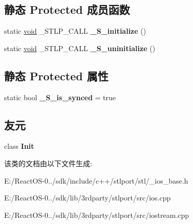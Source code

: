 \subsection*{静态 Protected 成员函数}
\begin{DoxyCompactItemize}
\item 
\mbox{\label{classios__base_ac63009681540a793259bae95029d26e6}} 
static \hyperlink{interfacevoid}{void} \+\_\+\+S\+T\+L\+P\+\_\+\+C\+A\+LL {\bfseries \+\_\+\+S\+\_\+initialize} ()
\item 
\mbox{\label{classios__base_a73b47ee9e922d276a0ee67577d2a7d29}} 
static \hyperlink{interfacevoid}{void} \+\_\+\+S\+T\+L\+P\+\_\+\+C\+A\+LL {\bfseries \+\_\+\+S\+\_\+uninitialize} ()
\end{DoxyCompactItemize}
\subsection*{静态 Protected 属性}
\begin{DoxyCompactItemize}
\item 
\mbox{\label{classios__base_a6de59e947de9b9c3333ad2f2805e514c}} 
static bool {\bfseries \+\_\+\+S\+\_\+is\+\_\+synced} = true
\end{DoxyCompactItemize}
\subsection*{友元}
\begin{DoxyCompactItemize}
\item 
\mbox{\label{classios__base_ab3afe096d892713710032f1f1cd15948}} 
class {\bfseries Init}
\end{DoxyCompactItemize}


该类的文档由以下文件生成\+:\begin{DoxyCompactItemize}
\item 
E\+:/\+React\+O\+S-\/0../sdk/include/c++/stlport/stl/\+\_\+ios\+\_\+base.\+h\item 
E\+:/\+React\+O\+S-\/0../sdk/lib/3rdparty/stlport/src/ios.\+cpp\item 
E\+:/\+React\+O\+S-\/0../sdk/lib/3rdparty/stlport/src/iostream.\+cpp\end{DoxyCompactItemize}
